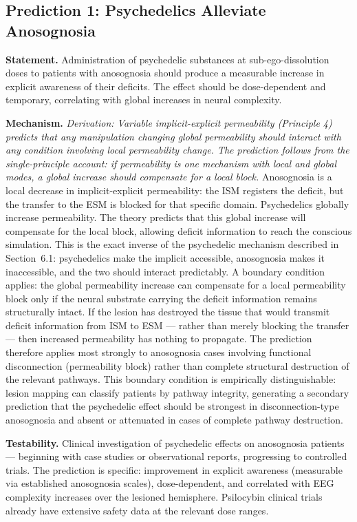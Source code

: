 \documentclass[12pt]{article}
\begin{document}
\subsection{Prediction 1: Psychedelics Alleviate Anosognosia}


\textbf{Statement.} Administration of psychedelic substances at sub-ego-dissolution doses to patients with anosognosia should produce a measurable increase in explicit awareness of their deficits. The effect should be dose-dependent and temporary, correlating with global increases in neural complexity.

\textbf{Mechanism.} \emph{Derivation: Variable implicit-explicit permeability (Principle 4) predicts that any manipulation changing global permeability should interact with any condition involving local permeability change. The prediction follows from the single-principle account: if permeability is one mechanism with local and global modes, a global increase should compensate for a local block.} Anosognosia is a local decrease in implicit-explicit permeability: the ISM registers the deficit, but the transfer to the ESM is blocked for that specific domain. Psychedelics globally increase permeability. The theory predicts that this global increase will compensate for the local block, allowing deficit information to reach the conscious simulation. This is the exact inverse of the psychedelic mechanism described in Section~6.1: psychedelics make the implicit accessible, anosognosia makes it inaccessible, and the two should interact predictably. A boundary condition applies: the global permeability increase can compensate for a local permeability block only if the neural substrate carrying the deficit information remains structurally intact. If the lesion has destroyed the tissue that would transmit deficit information from ISM to ESM --- rather than merely blocking the transfer --- then increased permeability has nothing to propagate. The prediction therefore applies most strongly to anosognosia cases involving functional disconnection (permeability block) rather than complete structural destruction of the relevant pathways. This boundary condition is empirically distinguishable: lesion mapping can classify patients by pathway integrity, generating a secondary prediction that the psychedelic effect should be strongest in disconnection-type anosognosia and absent or attenuated in cases of complete pathway destruction.

\textbf{Testability.} Clinical investigation of psychedelic effects on anosognosia patients --- beginning with case studies or observational reports, progressing to controlled trials. The prediction is specific: improvement in explicit awareness (measurable via established anosognosia scales), dose-dependent, and correlated with EEG complexity increases over the lesioned hemisphere. Psilocybin clinical trials already have extensive safety data at the relevant dose ranges.
\end{document}
